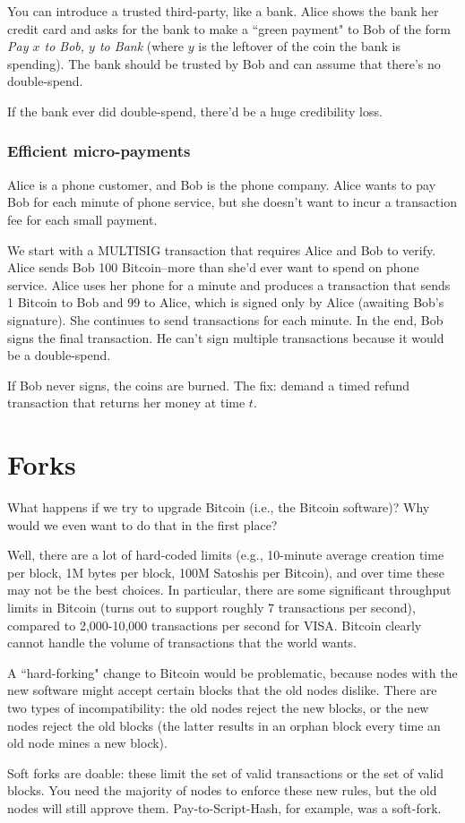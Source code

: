 \documentclass[12pt]{article}
\begin{document}
You can introduce a trusted third-party, like a bank. Alice shows the bank her credit card and asks for the bank to make a ``green payment" to Bob of the form \textit{Pay $x$ to Bob, $y$ to Bank} (where $y$ is the leftover of the coin the bank is spending). The bank should be trusted by Bob and can assume that there's no double-spend.

If the bank ever did double-spend, there'd be a huge credibility loss.

\subsubsection*{Efficient micro-payments}

Alice is a phone customer, and Bob is the phone company. Alice wants to pay Bob for each minute of phone service, but she doesn't want to incur a transaction fee for each small payment.

We start with a MULTISIG transaction that requires Alice and Bob to verify. Alice sends Bob 100 Bitcoin--more than she'd ever want to spend on phone service. Alice uses her phone for a minute and produces a transaction that sends 1 Bitcoin to Bob and 99 to Alice, which is signed only by Alice (awaiting Bob's signature). She continues to send transactions for each minute. In the end, Bob signs the final transaction. He can't sign multiple transactions because it would be a double-spend.

If Bob never signs, the coins are burned. The fix: demand a timed refund transaction that returns her money at time $t$.

\section*{Forks}

What happens if we try to upgrade Bitcoin (i.e., the Bitcoin software)? Why would we even want to do that in the first place?

Well, there are a lot of hard-coded limits (e.g., 10-minute average creation time per block, 1M bytes per block, 100M Satoshis per Bitcoin), and over time these may not be the best choices. In particular, there are some significant throughput limits in Bitcoin (turns out to support roughly 7 transactions per second), compared to 2,000-10,000 transactions per second for VISA. Bitcoin clearly cannot handle the volume of transactions that the world wants.

A ``hard-forking" change to Bitcoin would be problematic, because nodes with the new software might accept certain blocks that the old nodes dislike. There are two types of incompatibility: the old nodes reject the new blocks, or the new nodes reject the old blocks (the latter results in an orphan block every time an old node mines a new block).

Soft forks are doable: these limit the set of valid transactions or the set of valid blocks. You need the majority of nodes to enforce these new rules, but the old nodes will still approve them. Pay-to-Script-Hash, for example, was a soft-fork.
\end{document}
